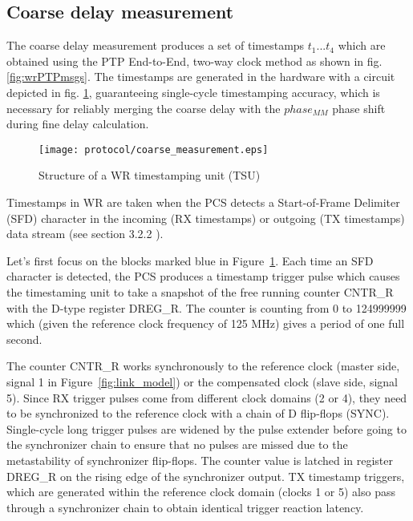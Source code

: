 \subsection{Coarse delay measurement}
\label{s:coarse_delay}
The coarse delay measurement produces a set of timestamps $t_{1} ... t_{4}$
which are obtained using the PTP End-to-End, two-way clock method as shown
in fig. \ref{fig:wrPTPmsgs}. The timestamps are generated in the hardware
with a circuit depicted in fig. \ref{fig:coarse_measurement}, guaranteeing
single-cycle timestamping accuracy, which is necessary for reliably merging the
coarse delay with the $phase_{MM}$ phase shift during fine delay calculation.
\begin{figure}[ht!]
  \centering
  \texttt{[image: protocol/coarse\_measurement.eps]}
  \caption{Structure of a WR timestamping unit (TSU)}
  \label{fig:coarse_measurement}
\end{figure}
Timestamps in WR are taken when the PCS detects a Start-of-Frame Delimiter
(SFD) character in the incoming (RX timestamps) or outgoing (TX timestamps)
data stream (see section 3.2.2 \cite{tomekMSC}).

Let's first focus on the blocks marked blue in
Figure~\ref{fig:coarse_measurement}. Each time an SFD character is detected,
the PCS produces a timestamp trigger pulse which causes the timestaming unit
to take a snapshot of the free running counter CNTR\_R with the D-type
register DREG\_R. The counter is counting from 0 to 124999999 which (given
the reference clock frequency of 125 MHz) gives a period of one full second.

The counter CNTR\_R works synchronously to the reference clock (master side,
signal 1 in Figure~\ref{fig:link_model}) or the compensated clock (slave side,
signal 5). Since RX trigger pulses come from different clock domains (2 or
4), they need to be synchronized to the reference clock with a chain of
D flip-flops (SYNC). Single-cycle long trigger pulses are widened by the
pulse extender before going to the synchronizer chain to ensure that no
pulses are missed due to the metastability of synchronizer flip-flops. The
counter value is latched in register DREG\_R on the rising edge of the
synchronizer output. TX timestamp triggers, which are generated within the
reference clock domain (clocks 1 or 5) also pass through a synchronizer
chain to obtain identical trigger reaction latency.

